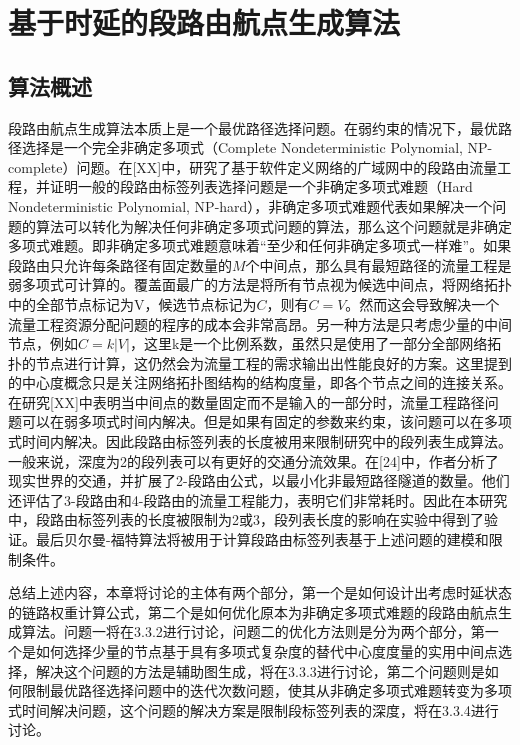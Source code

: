 \section{基于时延的段路由航点生成算法}

\subsection{算法概述}

段路由航点生成算法本质上是一个最优路径选择问题。在弱约束的情况下，最优路径选择是一个完全非确定多项式（Complete Nondeterministic Polynomial, NP-complete）问题。在[XX]中，研究了基于软件定义网络的广域网中的段路由流量工程，并证明一般的段路由标签列表选择问题是一个非确定多项式难题（Hard Nondeterministic Polynomial, NP-hard），非确定多项式难题代表如果解决一个问题的算法可以转化为解决任何非确定多项式问题的算法，那么这个问题就是非确定多项式难题。即非确定多项式难题意味着“至少和任何非确定多项式一样难”。如果段路由只允许每条路径有固定数量的$M$个中间点，那么具有最短路径的流量工程是弱多项式可计算的。覆盖面最广的方法是将所有节点视为候选中间点，将网络拓扑中的全部节点标记为V，候选节点标记为$C$，则有$C = V$。然而这会导致解决一个流量工程资源分配问题的程序的成本会非常高昂。另一种方法是只考虑少量的中间节点，例如$C=k|V|$，这里k是一个比例系数，虽然只是使用了一部分全部网络拓扑的节点进行计算，这仍然会为流量工程的需求输出出性能良好的方案。这里提到的中心度概念只是关注网络拓扑图结构的结构度量，即各个节点之间的连接关系。在研究[XX]中表明当中间点的数量固定而不是输入的一部分时，流量工程路径问题可以在弱多项式时间内解决。但是如果有固定的参数来约束，该问题可以在多项式时间内解决。因此段路由标签列表的长度被用来限制研究中的段列表生成算法。一般来说，深度为2的段列表可以有更好的交通分流效果。在[24]中，作者分析了现实世界的交通，并扩展了2-段路由公式，以最小化非最短路径隧道的数量。他们还评估了3-段路由和4-段路由的流量工程能力，表明它们非常耗时。因此在本研究中，段路由标签列表的长度被限制为2或3，段列表长度的影响在实验中得到了验证。最后贝尔曼-福特算法将被用于计算段路由标签列表基于上述问题的建模和限制条件。

总结上述内容，本章将讨论的主体有两个部分，第一个是如何设计出考虑时延状态的链路权重计算公式，第二个是如何优化原本为非确定多项式难题的段路由航点生成算法。问题一将在3.3.2进行讨论，问题二的优化方法则是分为两个部分，第一个是如何选择少量的节点基于具有多项式复杂度的替代中心度度量的实用中间点选择，解决这个问题的方法是辅助图生成，将在3.3.3进行讨论，第二个问题则是如何限制最优路径选择问题中的迭代次数问题，使其从非确定多项式难题转变为多项式时间解决问题，这个问题的解决方案是限制段标签列表的深度，将在3.3.4进行讨论。

